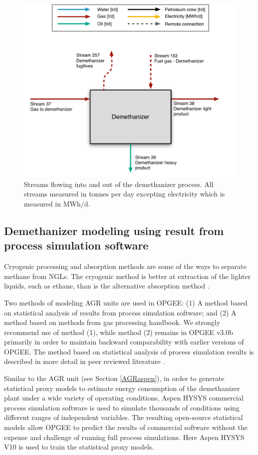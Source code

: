 \documentclass[11pt]{report}
\newcommand{\version}{v3.0b }
\begin{document}
\begin{figure}
\includegraphics[width=0.85\columnwidth]{images/Demethanizer_PF.pdf}
\caption{Streams flowing into and out of the demethanizer process. All streams measured in tonnes per day excepting electricity which is measured in MWh/d.}
\label{fig:demethanizer_PF}
\end{figure}

\subsection{Demethanizer modeling using result from process simulation software} \label{Demethanizer_aspen}

Cryogenic processing and absorption methods are some of the ways to separate methane from NGLs. The cryogenic method is better at extraction of the lighter liquids, such as ethane, than is the alternative absorption method \cite{roy2011aspen}. 

Two methods of modeling AGR units are used in OPGEE: (1) A method based on statistical analysis of results from process simulation software; and (2) A method based on methods from gas processing handbook. We strongly recommend use of method (1), while method (2) remains in OPGEE \version primarily in order to maintain backward comparability with earlier versions of OPGEE. The method based on statistical analysis of process simulation results is described in more detail in peer reviewed literature \cite{Masnadi2020}.

Similar to the AGR unit (see Section \ref{AGRaspen}), in order to generate statistical proxy models to estimate energy consumption of the demethanizer plant under a wide variety of operating conditions, Aspen HYSYS commercial process simulation software is used to simulate thousands of conditions using different ranges of independent variables. The resulting open-source statistical models allow OPGEE to predict the results of commercial software without the expense and challenge of running full process simulations. Here Aspen HYSYS V10 is used to train the statistical proxy models. 
\end{document}
